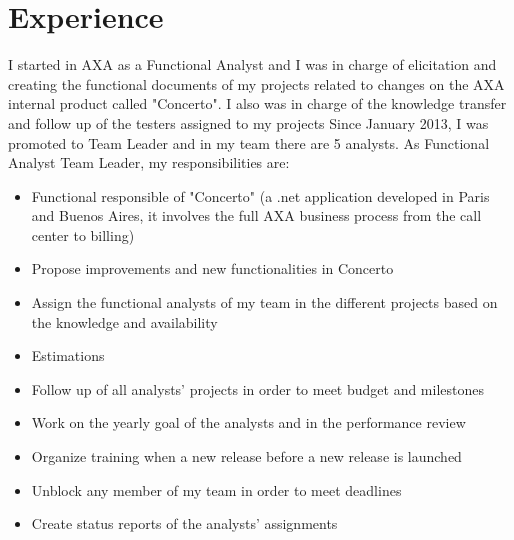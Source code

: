 \documentclass[11pt,a4paper,sans]{moderncv}
\begin{document}
\section{Experience}
{
I started in AXA as a Functional Analyst and I was in charge of elicitation and creating the functional documents of my projects related to changes on the AXA internal product called "Concerto". I also was in charge of the knowledge transfer and follow up of the testers assigned to my projects
\newline{}
Since January 2013, I was promoted to Team Leader and in my team there are 5 analysts.
\newline{}
As Functional Analyst Team Leader, my responsibilities are:
}
\begin{itemize}
  \item Functional responsible of "Concerto" (a .net application developed in Paris and Buenos Aires, it involves the full AXA business process from the call center to billing) 
  \item Propose improvements and new functionalities in Concerto 
  \item Assign the functional analysts of my team in the different projects based on the knowledge and availability
  \item Estimations
  \item Follow up of all analysts' projects in order to meet budget and milestones
  \item Work on the yearly goal of the analysts and in the performance review
  \item Organize training when a new release before a new release is launched
  \item Unblock any member of my team in order to meet deadlines
  \item Create status reports of the analysts' assignments
\newline{}
\end{itemize}




\end{document}
